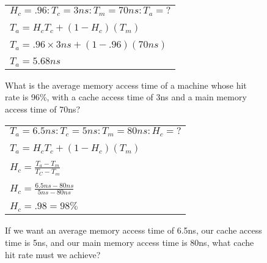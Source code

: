 \documentclass{article}
\begin{document}
\setcounter{figure}{24}
\begin{figure}[h]
\centering
\caption{What is the average memory access time of a machine whose hit rate is 96\%, with a cache access time of 3ns and a main memory access time of 70ns?}
	\begin{tabular}{ l }
		$H_c = .96 \colon T_c = 3ns \colon T_m = 70ns \colon T_a = ?$\\
		\hfill\\
		$T_a = H_c T_c + (1 - H_c)(T_m)$\\
		\hfill\\
		$T_a = .96 \times 3ns + (1-.96)(70ns)$\\
		\hfill\\
		$T_a = 5.68ns$
	\end{tabular}
\end{figure}


\setcounter{figure}{25}
\begin{figure}[h]
\centering
\caption{If we want an average memory access time of 6.5ns, our cache access time is 5ns, and our main memory access time is 80ns, what cache hit rate must we achieve?}
	\begin{tabular}{ l }
		$T_a = 6.5ns \colon T_c = 5ns \colon T_m = 80ns \colon H_c = ?$\\
		\hfill\\
		$T_a = H_c T_c + (1 - H_c)(T_m)$\\
		\hfill\\
		$H_c = \frac{T_a - T_m}{T_C - T_m}$\\
		\hfill\\
		$H_c = \frac{6.5ns - 80ns}{5ns - 80ns}$\\
		\hfill\\
		$H_c = .98 = 98\%$
	\end{tabular}
\end{figure}

\label{end}
\end{document}
